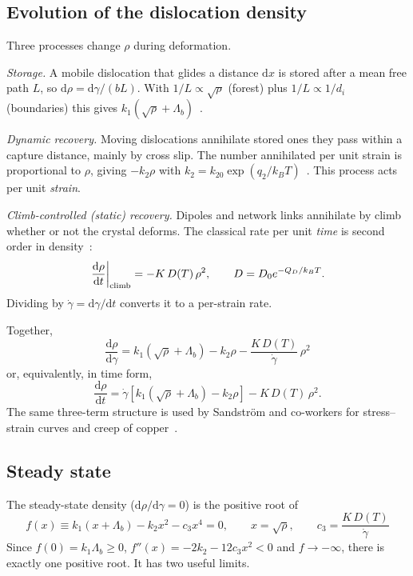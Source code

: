 \documentclass[11pt]{article}
\newcommand{\gd}{\dot\gamma}
\newcommand{\kT}{k_BT}
\newcommand{\dd}{\mathrm{d}}
\numberwithin{equation}{section}
\begin{document}
\subsection{Evolution of the dislocation density}
Three processes change $\rho$ during deformation.

\emph{Storage.} A mobile dislocation that glides a distance $\dd x$ is stored after a mean free path $L$, so $\dd\rho=\dd\gamma/(bL)$. With $1/L\propto\sqrt\rho$ (forest) plus $1/L\propto1/d_i$ (boundaries) this gives $k_1(\sqrt\rho+\Lambda_b)$~\cite{Kocks1976,MeckingKocks,EstrinMecking1984,Estrin1996}.

\emph{Dynamic recovery.} Moving dislocations annihilate stored ones they pass within a capture distance, mainly by cross slip. The number annihilated per unit strain is proportional to $\rho$, giving $-k_2\rho$ with $k_2=k_{20}\exp(q_2/\kT)$~\cite{Kocks1976,MeckingKocks}. This process acts per unit \emph{strain}.

\emph{Climb-controlled (static) recovery.} Dipoles and network links annihilate by climb whether or not the crystal deforms. The classical rate per unit \emph{time} is second order in density~\cite{KMR1949,SandstromLagneborg1975,Sandstrom1977,Nes1995}:
\begin{equation}
\left.\frac{\dd\rho}{\dd t}\right|_{\rm climb}=-K\,D(T)\,\rho^2,\qquad D=D_0e^{-Q_D/\kT}.
\end{equation}
Dividing by $\gd=\dd\gamma/\dd t$ converts it to a per-strain rate.

Together,
\begin{equation}
\boxed{\;\frac{\dd\rho}{\dd\gamma}=k_1\left(\sqrt\rho+\Lambda_b\right)-k_2\rho-\frac{K\,D(T)}{\gd}\,\rho^2\;}
\label{eq:km}
\end{equation}
or, equivalently, in time form,
\begin{equation}
\frac{\dd\rho}{\dd t}=\gd\left[k_1\left(\sqrt\rho+\Lambda_b\right)-k_2\rho\right]-K\,D(T)\,\rho^2 .
\label{eq:km_time}
\end{equation}
The same three-term structure is used by Sandstr\"om and co-workers for stress--strain curves and creep of copper~\cite{SandstromLagneborg1975,SandstromHallgren2012}.

\subsection{Steady state}
The steady-state density ($\dd\rho/\dd\gamma=0$) is the positive root of
\begin{equation}
\boxed{\;f(x)\equiv k_1(x+\Lambda_b)-k_2x^2-c_3x^4=0,\qquad x=\sqrt\rho,\qquad c_3=\frac{K\,D(T)}{\gd}\;}
\label{eq:ss}
\end{equation}
Since $f(0)=k_1\Lambda_b\ge0$, $f''(x)=-2k_2-12c_3x^2<0$ and $f\to-\infty$, there is exactly one positive root. It has two useful limits.
\end{document}
